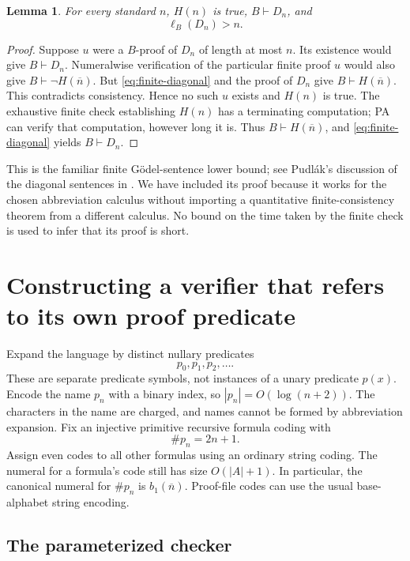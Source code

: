\documentclass[11pt]{article}
\newtheorem{lemma}[theorem]{Lemma}
\theoremstyle{remark}
\newcommand{\num}[1]{\overline{#1}}
\begin{document}
\begin{lemma}\label{lem:hard}
For every standard $n$, $H(n)$ is true, $B\vdash D_n$, and
\[
 \ell_B(D_n)>n.
\]
\end{lemma}
\begin{proof}
Suppose $u$ were a $B$-proof of $D_n$ of length at most $n$. Its existence
would give $B\vdash D_n$. Numeralwise verification of the particular finite
proof $u$ would also give $B\vdash\neg H(\num n)$. But
\eqref{eq:finite-diagonal} and the proof of $D_n$ give $B\vdash H(\num n)$.
This contradicts consistency. Hence no such $u$ exists and $H(n)$ is true.
The exhaustive finite check establishing $H(n)$ has a terminating computation;
PA can verify that computation, however long it is. Thus
$B\vdash H(\num n)$, and \eqref{eq:finite-diagonal} yields $B\vdash D_n$.
\end{proof}

This is the familiar finite G\"odel-sentence lower bound; see Pudl\'ak's
discussion of the diagonal sentences in \cite[Section 3.1]{pudlak2017}.
We have included its proof because it works for the chosen abbreviation
calculus without importing a quantitative finite-consistency theorem from
a different calculus. No bound on the time taken by the finite check is
used to infer that its proof is short.

\section{Constructing a verifier that refers to its own proof predicate}

Expand the language by distinct nullary predicates
\[
 p_0,p_1,p_2,\ldots.
\]
These are separate predicate symbols, not instances of a unary predicate
$p(x)$. Encode the name $p_n$ with a binary index, so $|p_n|=O(\log(n+2))$.
The characters in the name are charged, and names cannot be formed by
abbreviation expansion. Fix an injective primitive recursive formula coding
with
\begin{equation}\label{eq:atom-code}
 \#p_n=2n+1.
\end{equation}
Assign even codes to all other formulas using an ordinary string coding.
The numeral for a formula's code still has size $O(|A|+1)$. In particular,
the canonical numeral for $\#p_n$ is $b_1(\num n)$.
Proof-file codes can use the usual base-alphabet string encoding.

\subsection{The parameterized checker}
\end{document}
